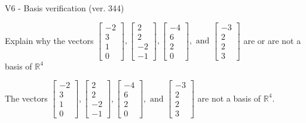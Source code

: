 \begin{exercise}
  \begin{exerciseTitle}V6 - Basis verification (ver. 344)\end{exerciseTitle}
  \begin{exerciseStatement}
    Explain why the vectors \(\left[\begin{array}{r}
-2 \\
3 \\
1 \\
0
\end{array}\right] , \left[\begin{array}{r}
2 \\
2 \\
-2 \\
-1
\end{array}\right] , \left[\begin{array}{r}
-4 \\
6 \\
2 \\
0
\end{array}\right] , \text{ and } \left[\begin{array}{r}
-3 \\
2 \\
2 \\
3
\end{array}\right]\) are or are not a basis of \(\mathbb{R}^4\)	


  \end{exerciseStatement}
  \begin{exerciseAnswer}
   The vectors \(\left[\begin{array}{r}
-2 \\
3 \\
1 \\
0
\end{array}\right] , \left[\begin{array}{r}
2 \\
2 \\
-2 \\
-1
\end{array}\right] , \left[\begin{array}{r}
-4 \\
6 \\
2 \\
0
\end{array}\right] , \text{ and } \left[\begin{array}{r}
-3 \\
2 \\
2 \\
3
\end{array}\right]\) 
  	 are not  a basis of \(\mathbb{R}^4\).
  


  \end{exerciseAnswer}
\end{exercise}
